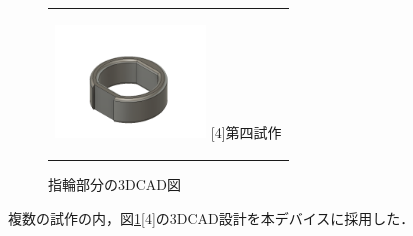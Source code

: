 \documentclass[11pt,a4paper]{jarticle}
\begin{document}
\begin{figure}[H]
\begin{center}
\begin{tabular}{c}
            \begin{minipage}{0.25\hsize}
        \begin{center}
          \includegraphics[clip, width=4cm]{fig/ring4.png}
          \hspace{3.2cm} [4]第四試作
        \end{center}
      \end{minipage}


    \end{tabular}
    \caption{指輪部分の3DCAD図}
    \label{fig:ring}
  \end{center}
\end{figure}

複数の試作の内，図\ref{fig:ring}[4]の3DCAD設計を本デバイスに採用した．
\end{document}
